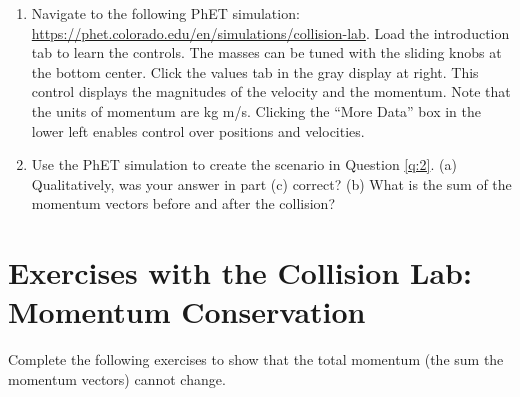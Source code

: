 \documentclass{article}
\begin{document}
\begin{enumerate}
\item Navigate to the following PhET simulation: \url{https://phet.colorado.edu/en/simulations/collision-lab}.  Load the introduction tab to learn the controls.  The masses can be tuned with the sliding knobs at the bottom center.  Click the values tab in the gray display at right.  This control displays the magnitudes of the velocity and the momentum.  Note that the units of momentum are kg m/s.  Clicking the ``More Data'' box in the lower left enables control over positions and velocities.
\item Use the PhET simulation to create the scenario in Question \ref{q:2}. (a) Qualitatively, was your answer in part (c) correct? (b) What is the sum of the momentum vectors before and after the collision?
\end{enumerate}

\section{Exercises with the Collision Lab: Momentum Conservation}

Complete the following exercises to show that the total momentum (the sum the momentum vectors) cannot change.
\end{document}
